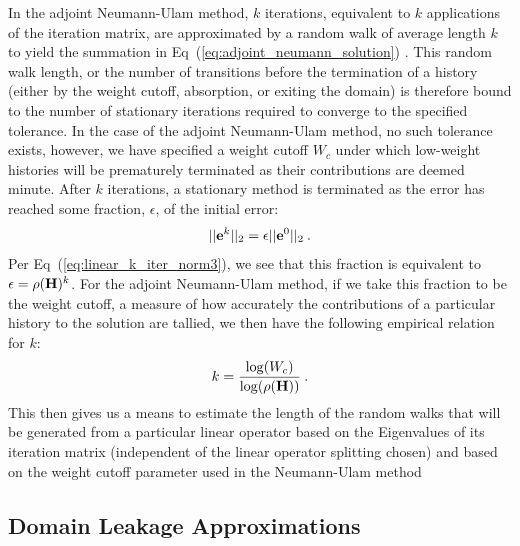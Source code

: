 \documentclass{mc2013}
\begin{document}
In the adjoint Neumann-Ulam method, $k$ iterations, equivalent to $k$
applications of the iteration matrix, are approximated by a random
walk of average length $k$ to yield the summation in
Eq~(\ref{eq:adjoint_neumann_solution})
\cite{dimov_new_1998,halton_sequential_1994,danilov_asymptotic_2000}. This
random walk length, or the number of transitions before the
termination of a history (either by the weight cutoff, absorption, or
exiting the domain) is therefore bound to the number of stationary
iterations required to converge to the specified tolerance. In the
case of the adjoint Neumann-Ulam method, no such tolerance exists,
however, we have specified a weight cutoff $W_c$ under which
low-weight histories will be prematurely terminated as their
contributions are deemed minute. After $k$ iterations, a stationary
method is terminated as the error has reached some fraction,
$\epsilon$, of the initial error:
\begin{equation}
  ||\mathbf{e}^{k}||_2 = \epsilon ||\mathbf{e}^0||_2\:.
  \label{eq:linear_k_iter_norm4}
\end{equation}
Per Eq~(\ref{eq:linear_k_iter_norm3}), we see that this fraction is
equivalent to $\epsilon = \rho(\mathbf{H})^k$. For the adjoint Neumann-Ulam
method, if we take this fraction to be the weight cutoff, a measure of
how accurately the contributions of a particular history to the
solution are tallied, we then have the following empirical relation
for $k$:
\begin{equation}
  k = \frac{ \log(W_c) }{ \log( \rho(\mathbf{H}) ) }\:.
  \label{eq:analytic_k}
\end{equation}
This then gives us a means to estimate the length of the random walks
that will be generated from a particular linear operator based on the
Eigenvalues of its iteration matrix (independent of the linear
operator splitting chosen) and based on the weight cutoff parameter
used in the Neumann-Ulam method

\subsection{Domain Leakage Approximations}
\label{subsec:domain_leak_approx}
\end{document}
